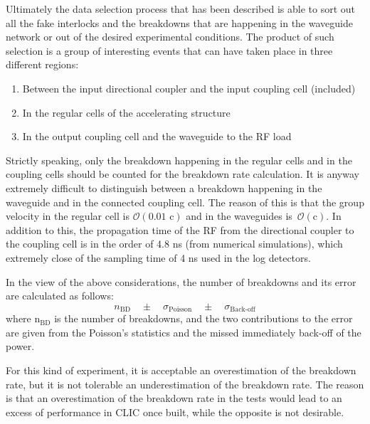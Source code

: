 Ultimately the data selection process that has been described is able to sort out all the fake interlocks and the breakdowns that are happening in the waveguide network or out of the desired experimental conditions. The product of such selection is a group of interesting events that can have taken place in three different regions:
\begin{enumerate}
\item Between the input directional coupler and the input coupling cell (included)
\item In the regular cells of the accelerating structure
\item In the output coupling cell and the waveguide to the RF load
\end{enumerate}
Strictly speaking, only the breakdown happening in the regular cells and in the coupling cells should be counted for the breakdown rate calculation. It is anyway extremely difficult to distinguish between a breakdown happening in the waveguide and in the connected coupling cell. The reason of this is that the group velocity in the regular cell is $\mathcal{O}(\text{0.01 c})$ and in the waveguides is~$\mathcal{O}(\text{c})$. In addition to this, the propagation time of the RF from the directional coupler to the coupling cell is in the order of 4.8 ns (from numerical simulations), which extremely close of the sampling time of 4 ns used in the log detectors. 

In the view of the above considerations, the number of breakdowns and its error are calculated as follows:
\begin{equation}
n_{\text{BD}} \quad \pm \quad \sigma_{\text{Poisson}} \quad \pm \quad \sigma_{\text{Back-off}} 
\label{numBD}
\end{equation}
where  n$_{\text{BD}}$ is the number of breakdowns, and the two contributions to the error are given from the Poisson's statistics and the missed immediately back-off of the power. 

For this kind of experiment, it is acceptable an overestimation of the breakdown rate, but it is not tolerable an underestimation of the breakdown rate. The reason is that an overestimation of the breakdown rate in the tests would lead to an excess of performance in CLIC once built, while the opposite is not desirable.   


